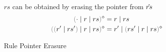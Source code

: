 
\begin{figure}[ht]

        {$rs$ can be obtained by erasing the pointer from $\hat{rs}$}
\begin{align*}
  \rmpointer{\zruls{\cdot}{r}{rs}} &= \hrules{r}{rs} \\
  \rmpointer{\zruls{\hrulesP{r'}{rs'}}{r}{rs}} &= \hrules{r'}{\rmpointer{\zruls{rs'}{r}{rs}}}
\end{align*}

\caption{Rule Pointer Erasure}
\label{fig:pointer-eraser}
\end{figure}
